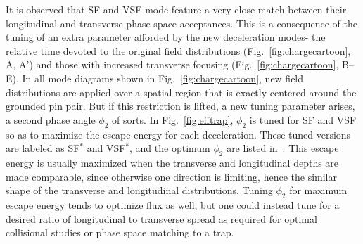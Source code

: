 \documentclass[%
 reprint,
 amsmath,amssymb,
 aps,
prl,
]{revtex4-1}
\begin{document}
It is observed that SF and VSF mode feature a very close match between their longitudinal and transverse phase space acceptances.
This is a consequence of the tuning of an extra parameter afforded by the new deceleration modes- the relative time devoted to the original field distributions (Fig.~\ref{fig:chargecartoon}, A, A') and those with increased transverse focusing (Fig.~\ref{fig:chargecartoon}, B--E).
In all mode diagrams shown in Fig.~\ref{fig:chargecartoon}, new field distributions are applied over a spatial region that is exactly centered around the grounded pin pair.
But if this restriction is lifted, a new tuning parameter arises, a second phase angle $\phi_2$ of sorts.
In Fig.~\ref{fig:efftrap}, $\phi_2$ is tuned for SF and VSF so as to maximize the escape energy for each deceleration.
These tuned versions are labeled as SF$^*$ and VSF$^*$, and the optimum $\phi_2$ are listed in~\cite{ssm}.
This escape energy is usually maximized when the transverse and longitudinal depths are made comparable, since otherwise one direction is limiting, hence the similar shape of the transverse and longitudinal distributions.
Tuning $\phi_2$ for maximum escape energy tends to optimize flux as well, but one could instead tune for a desired ratio of longitudinal to transverse spread as required for optimal collisional studies or phase space matching to a trap.





\end{document}
